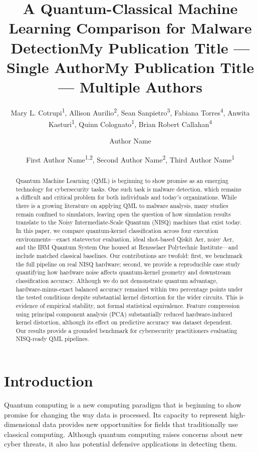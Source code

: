 \documentclass[letterpaper]{article} %
\title{A Quantum-Classical Machine Learning Comparison for Malware Detection}
\author{
    Mary L. Cotrupi\textsuperscript{\rm 1}, Allison Aurilio\textsuperscript{\rm 2}, Sean Sanpietro\textsuperscript{\rm 3}, Fabiana Torres\textsuperscript{\rm 4}, Anwita Kasturi\textsuperscript{\rm 1}, Quinn Colognato\textsuperscript{\rm 1}, Brian Robert Callahan\textsuperscript{\rm 4}
}
\title{My Publication Title --- Single Author}
\author {
    Author Name
}
\title{My Publication Title --- Multiple Authors}
\author {
    First Author Name\textsuperscript{\rm 1,\rm 2},
    Second Author Name\textsuperscript{\rm 2},
    Third Author Name\textsuperscript{\rm 1}
}
\begin{document}
\maketitle

\begin{abstract}
Quantum Machine Learning (QML) is beginning to show promise as an emerging technology for cybersecurity tasks. One such task is malware detection, which remains a difficult and critical problem for both individuals and today's organizations. While there is a growing literature on applying QML to malware analysis, many studies remain confined to simulators, leaving open the question of how simulation results translate to the Noisy Intermediate-Scale Quantum (NISQ) machines that exist today. In this paper, we compare quantum-kernel classification across four execution environments---exact statevector evaluation, ideal shot-based Qiskit Aer, noisy Aer, and the IBM Quantum System One housed at Rensselaer Polytechnic Institute---and include matched classical baselines. Our contributions are twofold: first, we benchmark the full pipeline on real NISQ hardware; second, we provide a reproducible case study quantifying how hardware noise affects quantum-kernel geometry and downstream classification accuracy. Although we do not demonstrate quantum advantage, hardware-minus-exact balanced accuracy remained within two percentage points under the tested conditions despite substantial kernel distortion for the wider circuits. This is evidence of empirical stability, not formal statistical equivalence. Feature compression using principal component analysis (PCA) substantially reduced hardware-induced kernel distortion, although its effect on predictive accuracy was dataset dependent. Our results provide a grounded benchmark for cybersecurity practitioners evaluating NISQ-ready QML pipelines.
\end{abstract}

\section{Introduction}

Quantum computing is a new computing paradigm that is beginning to show promise for changing the way data is processed. Its capacity to represent high-dimensional data provides new opportunities for fields that traditionally use classical computing. Although quantum computing raises concerns about new cyber threats, it also has potential defensive applications in detecting them.
\end{document}
